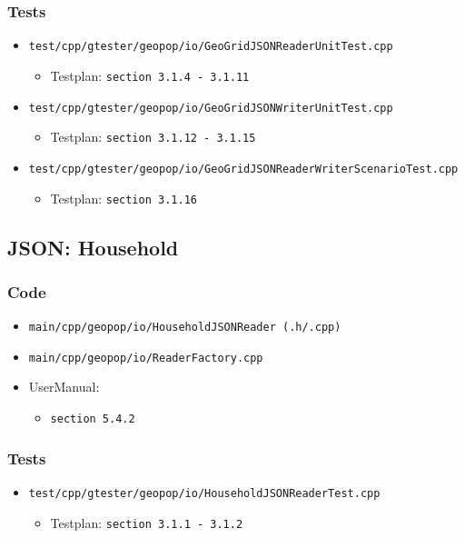 \documentclass[runningheads]{llncs}
\begin{document}
	\subsubsection{Tests}
	\begin{itemize}
		\item \texttt{test/cpp/gtester/geopop/io/GeoGridJSONReaderUnitTest.cpp}
			\begin{itemize}
				\item Testplan: \texttt{section 3.1.4 - 3.1.11}
			\end{itemize}
		\item \texttt{test/cpp/gtester/geopop/io/GeoGridJSONWriterUnitTest.cpp}
			\begin{itemize}
				\item Testplan: \texttt{section 3.1.12 - 3.1.15}
			\end{itemize}
		\item \texttt{test/cpp/gtester/geopop/io/GeoGridJSONReaderWriterScenarioTest.cpp}
			\begin{itemize}
				\item Testplan: \texttt{section 3.1.16}
			\end{itemize}
	\end{itemize}

	\subsection{JSON: Household}
	\subsubsection{Code}
	\begin{itemize}
		\item \texttt{main/cpp/geopop/io/HouseholdJSONReader (.h/.cpp)}
		\item \texttt{main/cpp/geopop/io/ReaderFactory.cpp}
		\item UserManual:
		\begin{itemize}
			\item \texttt{section 5.4.2}
		\end{itemize}
	\end{itemize}

	\subsubsection{Tests}
	\begin{itemize}
		\item \texttt{test/cpp/gtester/geopop/io/HouseholdJSONReaderTest.cpp}
		\begin{itemize}
			\item Testplan: \texttt{section 3.1.1 - 3.1.2}
		\end{itemize}
	\end{itemize}
\end{document}
